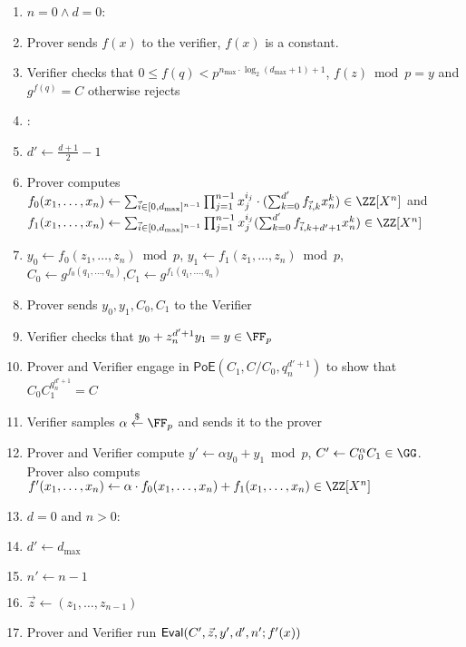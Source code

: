 \documentclass{article}
\theoremstyle{definition}
\begin{document}
\begin{small}
\begin{minipage}{1.1\textwidth}
\begin{mdframed}[userdefinedwidth=1\textwidth]
\begin{enumerate}[nolistsep]
\item \pcif $n=0 \wedge d=0$:
\item \pcind[1] Prover sends $f(x)$ to the verifier, $f(x)$ is a constant. 
\item \pcind[1] Verifier checks that $0\leq f(q)< p^{n_{\max}\cdot \log_2(d_{\max}+1)+1}$,  $f(z) \bmod p=y$ and $g^{f(q)}=C$ otherwise rejects
\item \pcelse: 
\item \pcind[1] $d'\gets \frac{d+1}{2}-1$
\item \pcind[1] Prover computes $f_0(x_1,\dots,x_n)\gets \sum_{\vec{i} \in [0,d_{\max}]^{n-1}}  \prod_{j=1}^{n-1} x_{j}^{i_j} \cdot(\sum_{k=0}^{d'} f_{\vec{i},k} x_{n}^k)\in \ZZ[X^n]$ and
$f_1(x_1,\dots,x_n)\gets \sum_{\vec{i} \in [0,d_{\max}]^{n-1}} \prod_{j=1}^{n-1} x_{j}^{i_j}(  \sum_{k=0}^{d'} f_{\vec{i},k+d'+1} x_{n}^{k})\in \ZZ[X^n]$
\item \pcind[1] $y_0\gets f_0(z_1,\dots,z_n) \bmod p$, $y_1\gets f_1(z_1,\dots,z_n)\bmod p$,\\ $C_0\gets g^{f_0(q_1,\dots,q_n)}$,$C_1\gets g^{f_1(q_1,\dots,q_n)}$
\item \pcind[1] Prover sends $y_0,y_1,C_0,C_1$ to the Verifier
\item \pcind[1] Verifier checks that $y_0+z_n^{d'+1} y_1=y\in \FF_p$ 
\item \pcind[1] Prover and Verifier engage in $\textsf{PoE}(C_1,C/C_0,q_n^{d'+1})$ to show that $C_0C_1^{q_n^{d'+1}}=C$
\item \pcind[1] Verifier samples $\alpha \sample \FF_p$ and sends it to the prover
\item \pcind[1] Prover and Verifier compute $y'\gets\alpha y_0 +y_1 \bmod p$, $C'\gets C_0^{\alpha}C_1 \in \GG$. \\Prover also computs $f'(x_1,\dots,x_n)\gets\alpha  \cdot f_0(x_1,\dots,x_n)+f_1(x_1,\dots,x_n) \in \ZZ[X^n]$ 
\item \pcind[1] \pcif $d=0$ and $n>0$: 
\item \pcind[2] $d'\gets d_{\max}$
\item \pcind[2] $n'\gets n-1$
\item \pcind[2] $\vec{z}\gets (z_1,\dots,z_{n-1})$
\item \pcind[1] Prover and Verifier run $\textsf{{Eval}}(C',\vec{z},y',d',n';f'(x))$
\end{enumerate}
\end{mdframed}
\end{minipage}
\end{small}
\end{document}
